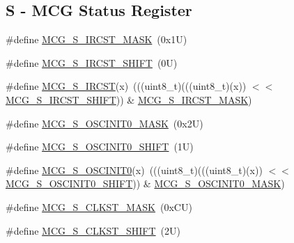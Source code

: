 \subsection*{S -\/ M\+CG Status Register}
\begin{DoxyCompactItemize}
\item 
\#define \mbox{\hyperlink{group___m_c_g___register___masks_ga1c693472984fb69650b117ffe5b76da5}{M\+C\+G\+\_\+\+S\+\_\+\+I\+R\+C\+S\+T\+\_\+\+M\+A\+SK}}~(0x1\+U)
\item 
\#define \mbox{\hyperlink{group___m_c_g___register___masks_ga9abb1ad8f00a085572bb58ab815b7afd}{M\+C\+G\+\_\+\+S\+\_\+\+I\+R\+C\+S\+T\+\_\+\+S\+H\+I\+FT}}~(0\+U)
\item 
\#define \mbox{\hyperlink{group___m_c_g___register___masks_ga9b7e5d9af38c4290a57311569d1e99f8}{M\+C\+G\+\_\+\+S\+\_\+\+I\+R\+C\+ST}}(x)~(((uint8\+\_\+t)(((uint8\+\_\+t)(x)) $<$$<$ \mbox{\hyperlink{group___m_c_g___register___masks_ga9abb1ad8f00a085572bb58ab815b7afd}{M\+C\+G\+\_\+\+S\+\_\+\+I\+R\+C\+S\+T\+\_\+\+S\+H\+I\+FT}})) \& \mbox{\hyperlink{group___m_c_g___register___masks_ga1c693472984fb69650b117ffe5b76da5}{M\+C\+G\+\_\+\+S\+\_\+\+I\+R\+C\+S\+T\+\_\+\+M\+A\+SK}})
\item 
\#define \mbox{\hyperlink{group___m_c_g___register___masks_ga75a97c37fbe3689889ea81fd04f13805}{M\+C\+G\+\_\+\+S\+\_\+\+O\+S\+C\+I\+N\+I\+T0\+\_\+\+M\+A\+SK}}~(0x2\+U)
\item 
\#define \mbox{\hyperlink{group___m_c_g___register___masks_ga3680bc3a628991bb5279d9d6b938b374}{M\+C\+G\+\_\+\+S\+\_\+\+O\+S\+C\+I\+N\+I\+T0\+\_\+\+S\+H\+I\+FT}}~(1\+U)
\item 
\#define \mbox{\hyperlink{group___m_c_g___register___masks_ga98c936496f313b82960d9de69a28ea69}{M\+C\+G\+\_\+\+S\+\_\+\+O\+S\+C\+I\+N\+I\+T0}}(x)~(((uint8\+\_\+t)(((uint8\+\_\+t)(x)) $<$$<$ \mbox{\hyperlink{group___m_c_g___register___masks_ga3680bc3a628991bb5279d9d6b938b374}{M\+C\+G\+\_\+\+S\+\_\+\+O\+S\+C\+I\+N\+I\+T0\+\_\+\+S\+H\+I\+FT}})) \& \mbox{\hyperlink{group___m_c_g___register___masks_ga75a97c37fbe3689889ea81fd04f13805}{M\+C\+G\+\_\+\+S\+\_\+\+O\+S\+C\+I\+N\+I\+T0\+\_\+\+M\+A\+SK}})
\item 
\#define \mbox{\hyperlink{group___m_c_g___register___masks_gaf43507c78cdda211a04b5ae0509edb2e}{M\+C\+G\+\_\+\+S\+\_\+\+C\+L\+K\+S\+T\+\_\+\+M\+A\+SK}}~(0x\+C\+U)
\item 
\#define \mbox{\hyperlink{group___m_c_g___register___masks_gab0768a667adb2dc2e1fb7972f9fd85a4}{M\+C\+G\+\_\+\+S\+\_\+\+C\+L\+K\+S\+T\+\_\+\+S\+H\+I\+FT}}~(2\+U)
\item 

\end{DoxyCompactItemize}
